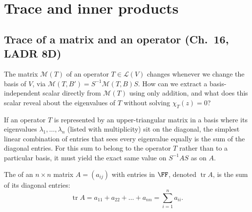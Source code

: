 \documentclass[10pt]{scrartcl}
\DeclareMathOperator{\tr}{tr}\DeclareMathOperator{\nul}{null}\DeclareMathOperator{\range}{range}\DeclareMathOperator{\spn}{span}
\newcommand{\LL}{\mathcal L}\newcommand{\PP}{\mathcal P}\newcommand{\MM}{\mathcal M}
\begin{document}
\section{Trace and inner products}
\subsection{Trace of a matrix and an operator (Ch.~16, LADR 8D)}

\begin{qbox}
  The matrix $\MM(T)$ of an operator $T\in\LL(V)$ changes whenever we change the basis of $V$, via $\MM(T,B')=S^{-1}\MM(T,B)S$. How can we extract a basis-independent scalar directly from $\MM(T)$ using only addition, and what does this scalar reveal about the eigenvalues of $T$ without solving $\chi_T(z)=0$?
\end{qbox}

If an operator $T$ is represented by an upper-triangular matrix in a basis where its eigenvalues $\lambda_1,\dots,\lambda_n$ (listed with multiplicity) sit on the diagonal, the simplest linear combination of entries that sees every eigenvalue equally is the sum of the diagonal entries. For this sum to belong to the operator $T$ rather than to a particular basis, it must yield the exact same value on $S^{-1}AS$ as on $A$.

\begin{definition*}
  The  of an $n\times n$ matrix $A=(a_{ij})$ with entries in $\FF$, denoted $\tr A$, is the sum of its diagonal entries:
  \[
    \tr A = a_{11} + a_{22} + \dots + a_{nn} = \sum_{i=1}^n a_{ii}.
  \]
\end{definition*}
\end{document}

